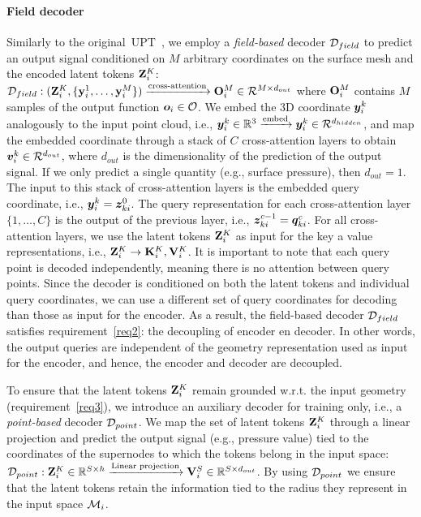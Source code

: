 \paragraph{Field decoder} 
Similarly to the original~\ac{UPT}~\cite{alkin2024universal}, we employ a \emph{field-based} decoder $\mathcal{D}_{field}$ to predict an output signal conditioned on $M$ arbitrary coordinates on the surface mesh and the encoded latent tokens $\mathbf{Z}_{i}^{K}$: $\mathcal{D}_{field}: (\mathbf{Z}_{i}^{K}, \{\mathbf{y}^{1}_{i}, \dots, \mathbf{y}^{M}_{i}\}) \xrightarrow[]{\text{cross-attention}} \mathbf{O}^{M}_{i} \in \mathcal{R}^{M \times d_{out}}$ where $\mathbf{O}^{M}_{i}$ contains $M$ samples of the output function $\bm{o}_i \in \mathcal{O}$.
We embed the 3D coordinate $\bm{y}_{i}^{k}$ analogously to the input point cloud, i.e., $\bm{y}_{i}^{k} \in \mathbb{R}^{3} \xrightarrow[]{\text{embed}} \bm{y}_{i}^{k} \in \mathcal{R}^{d_{hidden}}$, and map the embedded coordinate through a stack of $C$ cross-attention layers to obtain $\bm{v}_{i}^{k} \in \mathcal{R}^{d_{out}}$, where $d_{out}$ is the dimensionality of the prediction of the output signal. If we only predict a single quantity (e.g., surface pressure), then $d_{out} = 1$.
The input to this stack of cross-attention layers is the embedded query coordinate, i.e., $\bm{y}^{k}_{i} = \bm{z}^{0}_{ki}$. 
The query representation for each cross-attention layer $\{1, \dots, C\}$ is the output of the previous layer, i.e., $\bm{z}_{ki}^{c-1} = \bm{q}_{ki}^{c}$. 
For all cross-attention layers, we use the latent tokens $\mathbf{Z}_{i}^{K}$ as input for the key a value representations, i.e., $\mathbf{Z}^{K}_{i} \rightarrow \mathbf{K}^{K}_{i}, \mathbf{V}^{K}_{i}$.
It is important to note that each query point is decoded independently, meaning there is no attention between query points. 
Since the decoder is conditioned on both the latent tokens and individual query coordinates, we can use a different set of query coordinates for decoding than those as input for the encoder.
As a result, the field-based decoder $\mathcal{D}_{field}$ satisfies requirement~\ref{req2}: the decoupling of encoder en decoder. 
In other words, the output queries are independent of the geometry representation used as input for the encoder, and hence, the encoder and decoder are decoupled.

To ensure that the latent tokens $\mathbf{Z}^{K}_{i}$ remain grounded w.r.t. the input geometry (requirement~\ref{req3}), we introduce an auxiliary decoder for training only, i.e., a \emph{point-based} decoder $\mathcal{D}_{point}$. 
We map the set of latent tokens $\mathbf{Z}_{i}^{K}$ through a linear projection and predict the output signal (e.g., pressure value) tied to the coordinates of the supernodes to which the tokens belong in the input space: $\mathcal{D}_{point}: \mathbf{Z}_{i}^K \in \mathbb{R}^{S \times h} \xrightarrow[]{\text{Linear projection}} \mathbf{V}^{S}_{i} \in \mathbb{R}^{S \times d_{out}}$.
By using $\mathcal{D}_{point}$ we ensure that the latent tokens retain the information tied to the radius they represent in the input space $\mathcal{M}_{i}$. 

